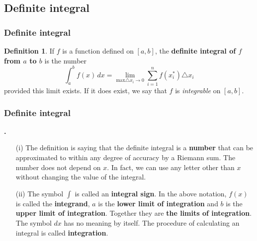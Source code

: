 \documentclass[t]{beamer}
\theoremstyle{plain}
\theoremstyle{definition}
\newtheorem{dfn}{Definition}
\newcounter{heading}
\newcommand{\newhead}[1]{\medskip\stepcounter{heading}\noindent\textbf{\hspace{0.2cm}{#1}.}}
\begin{document}
\subsection{Definite integral}
\begin{frame}
\frametitle{Definite integral}
\begin{dfn} If $f$ is a function defined on $[a,b]$, the \textbf{definite integral of $f$ from $a$ to $b$} is the number
\[ \int_{a}^{b} f(x)\,dx = \lim_{\textrm{max} \triangle x_{i} \rightarrow 0} \sum_{i=1}^{n} f(x_{i}^{*})\triangle x_{i}\]
provided this limit exists.  If it does exist, we say that $f$ is \emph{integrable} on $[a,b]$.
\end{dfn}

\begin{flushright}
\begin{small}
\hyperlink{r4}{}
\end{small}
\end{flushright}
\end{frame}

\begin{frame}
\frametitle{Definite integral}

\newhead{Remarks}
\begin{enumerate}[<+->]
\item[(i)] The definition is saying that the definite integral is a \textbf{number} that can be approximated to within any degree of accuracy by a Riemann sum.  The number does not depend on $x$.  In fact, we can use any letter other than $x$ without changing the value of the integral.
\item[(ii)] The symbol $\int$ is called an \textbf{integral sign}.  In the above notation, $f(x)$ is called the \textbf{integrand}, $a$ is the \textbf{lower limit of integration} and $b$ is the \textbf{upper limit of integration}.  Together they are \textbf{the limits of integration}.  The symbol $dx$ has no meaning by itself.  The procedure of calculating an integral is called \textbf{integration}.
\end{enumerate}
\end{frame}
\end{document}
